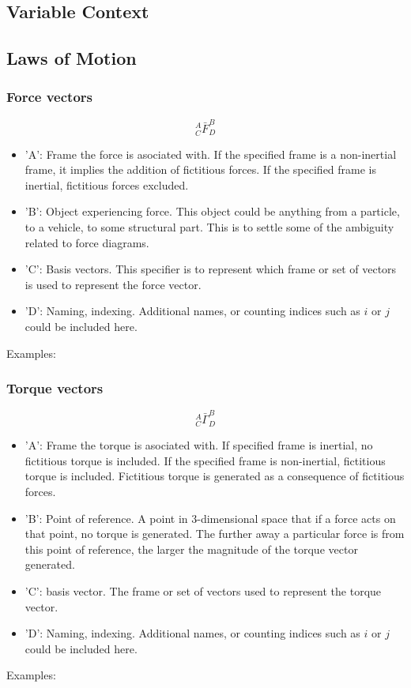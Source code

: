\documentclass[class=report, 12pt, crop=false]{standalone}
\begin{document}
\begin{center}
\section{Variable Context}
\begin{comment}
\end{comment}
\subsection{Laws of Motion}
\begin{comment}
\end{comment}
\subsubsection{Force vectors}
\begin{comment}
\end{comment}
$${}^{A}_{C}\bar{F}^{B}_{D}$$
\begin{itemize}
    \item 'A': Frame the force is asociated with. If the specified frame is a non-inertial frame, it implies the addition of fictitious forces. If the specified frame is inertial, fictitious forces excluded.
    \item 'B': Object experiencing force. This object could be anything from a particle, to a vehicle, to some structural part. This is to settle some of the ambiguity related to force diagrams.
    \item 'C': Basis vectors. This specifier is to represent which frame or set of vectors is used to represent the force vector.
    \item 'D': Naming, indexing. Additional names, or counting indices such as $i$ or $j$ could be included here.
\end{itemize}
Examples:
\subsubsection{Torque vectors}
\begin{comment}
\end{comment}
$${}^{A}_{C}\bar{\Gamma}^{B}_{D}$$
\begin{itemize}
    \item 'A': Frame the torque is asociated with. If specified frame is inertial, no fictitious torque is included. If the specified frame is non-inertial, fictitious torque is included. Fictitious torque is generated as a consequence of fictitious forces.
    \item 'B': Point of reference. A point in $3$-dimensional space that if a force acts on that point, no torque is generated. The further away a particular force is from this point of reference, the larger the magnitude of the torque vector generated.
    \item 'C': basis vector. The frame or set of vectors used to represent the torque vector.
    \item 'D': Naming, indexing. Additional names, or counting indices such as $i$ or $j$ could be included here.
\end{itemize}
Examples:

\end{center}
\end{document}
